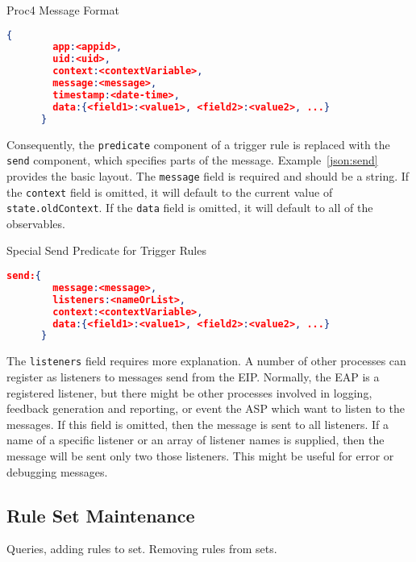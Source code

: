 \documentclass{article}
\begin{document}
  \begin{algorithm}
    \caption{Proc4 Message Format}
    \label{json:send}
    \begin{lstlisting}[language=json]
      {
        app:<appid>,
        uid:<uid>,
        context:<contextVariable>,
        message:<message>,
        timestamp:<date-time>,
        data:{<field1>:<value1>, <field2>:<value2>, ...}
      }
    \end{lstlisting}
  \end{algorithm}


  Consequently, the \texttt{predicate} component of a trigger rule is
  replaced with the \texttt{send} component, which specifies parts of
  the message.  Example~\ref{json:send} provides the basic layout.
  The \texttt{message} field is required and should be a string.  If
  the \texttt{context} field is omitted, it will default to the
  current value of \texttt{state.oldContext}.  If the \texttt{data}
  field is omitted, it will default to all of the observables.

  \begin{algorithm}
    \caption{Special Send Predicate for Trigger Rules}
    \label{json:send}
    \begin{lstlisting}[language=json]
      send:{
        message:<message>,
        listeners:<nameOrList>,
        context:<contextVariable>,
        data:{<field1>:<value1>, <field2>:<value2>, ...}
      }
    \end{lstlisting}
  \end{algorithm}

  The \texttt{listeners} field requires more explanation.  A number of
  other processes can register as listeners to messages send from the
  EIP.  Normally, the EAP is a registered listener, but there might be
  other processes involved in logging, feedback generation and
  reporting, or event the ASP which want to listen to the messages.
  If this field is omitted, then the message is sent to all
  listeners.  If a name of a specific listener or an array of listener
  names is supplied, then the message will be sent only two those
  listeners.  This might be useful for error or debugging messages.

  \subsection{Rule Set Maintenance}
  \label{sub:ruleSet}

  Queries, adding rules to set.  Removing rules from sets.
\end{document}
